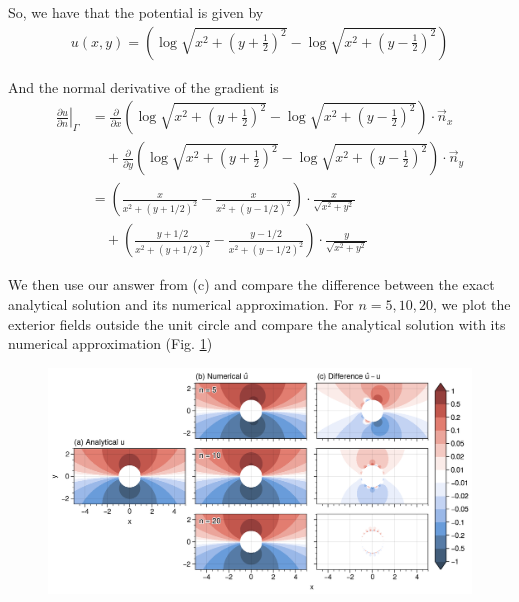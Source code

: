\begin{enumerate}[label=(\alph*),leftmargin=*,itemsep=0mm]
    So, we have that the potential is given by
    \begin{align}
        u(x,y) = \left( \log \sqrt{x^2 + \left( y + \frac{1}{2} \right)^2}
        - \log \sqrt{x^2 + \left( y - \frac{1}{2} \right)^2} \right)
    \end{align}
    
    And the normal derivative of the gradient is
    \begin{align}
        \left. \frac{\partial{u}}{\partial{n}} \right|_\Gamma
        &= \frac{\partial}{\partial{x}} \left( \log \sqrt{x^2 + \left( y + \frac{1}{2} \right)^2}
        - \log \sqrt{x^2 + \left( y - \frac{1}{2} \right)^2} \right) \cdot \vec{n}_x \nonumber \\
        &\quad + \frac{\partial}{\partial{y}} \left( \log \sqrt{x^2 + \left( y + \frac{1}{2} \right)^2}
        - \log \sqrt{x^2 + \left( y - \frac{1}{2} \right)^2} \right) \cdot \vec{n}_y \nonumber \\
        &= \left( \frac{x}{x^2+(y+1/2)^2} - \frac{x}{x^2+(y-1/2)^2} \right) \cdot \frac{x}{\sqrt{x^2+y^2}} \nonumber \\
        &\quad + \left( \frac{y+1/2}{x^2+(y+1/2)^2} - \frac{y-1/2}{x^2+(y-1/2)^2} \right) \cdot \frac{y}{\sqrt{x^2+y^2}}
    \end{align}
    
    We then use our answer from (c) and compare the difference between the exact analytical solution and its numerical approximation.  For $n=5,10,20$, we plot the exterior fields outside the unit circle and compare the analytical solution with its numerical approximation (Fig. \ref{prj3_qn1d_field})

    \begin{figure}[h!]
    \centering
    \includegraphics[width=\textwidth]{figures/prj3_qn1d_field.png}\\
    \caption{}
    \label{prj3_qn1d_field}
    \end{figure}
    

\end{enumerate}
